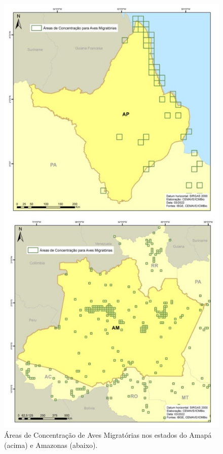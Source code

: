 \documentclass[
  oneside]{scrbook}
\begin{document}
\begin{figure}[H]

{\centering \includegraphics[width=0.7\linewidth]{imagens/cap07/Fig_16_AP_AM} 

}

\caption{Áreas de Concentração de Aves Migratórias nos estados do Amapá (acima) e Amazonas (abaixo).}\label{fig:36}
\end{figure}
\end{document}

